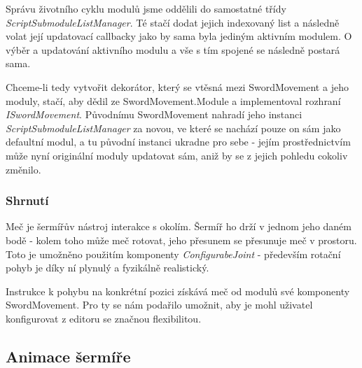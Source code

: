 Správu životního cyklu modulů jsme oddělili do samostatné třídy \textit{ScriptSubmoduleListManager}. Té stačí dodat jejich indexovaný list a následně volat její updatovací callbacky jako by sama byla jediným aktivním modulem. O výběr a updatování aktivního modulu a vše s tím spojené se následně postará sama. 

Chceme-li tedy vytvořit dekorátor, který se vtěsná mezi SwordMovement a jeho moduly, stačí, aby dědil ze SwordMovement.Module a implementoval rozhraní \textit{ISwordMovement}. Původnímu SwordMovement nahradí jeho instanci \textit{ScriptSubmoduleListManager} za novou, ve které se nachází pouze on sám jako defaultní modul, a tu původní instanci ukradne pro sebe - jejím prostřednictvím může nyní originální moduly updatovat sám, aniž by se z jejich pohledu cokoliv změnilo.


\subsubsection*{Shrnutí}

Meč je šermířův nástroj interakce s okolím. Šermíř ho drží v jednom jeho daném bodě - kolem toho může meč rotovat, jeho přesunem se přesunuje meč v prostoru. Toto je umožněno použitím komponenty \textit{ConfigurabeJoint} - především rotační pohyb je díky ní plynulý a fyzikálně realistický. 

Instrukce k pohybu na konkrétní pozici získává meč od modulů své komponenty SwordMovement. Pro ty se nám podařilo umožnit, aby je mohl uživatel konfigurovat z editoru se značnou flexibilitou.



\subsection{Animace šermíře} \label{swordsmanAnimationSubsection}

